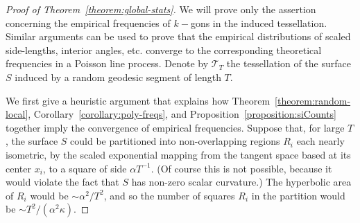 \documentclass[AHL, Unicode, longabstracts, published]{cedram}
\begin{document}
\begin{proof}
[Proof of Theorem~\ref{theorem:global-stats}] We will prove only the assertion concerning the empirical frequencies of $k-$gons in the induced tessellation. Similar arguments can be used to prove that the empirical distributions of scaled side-lengths, interior angles, etc. converge to the corresponding theoretical frequencies in a Poisson line process. Denote by $\mathcal{T}_{T}$ the tessellation of the surface $S$ induced by a random geodesic segment of length $T$.

We first give a heuristic argument that explains how Theorem~\ref{theorem:random-local}, Corollary~\ref{corollary:poly-freqs}, and Proposition~\ref{proposition:siCounts} together imply the convergence of empirical frequencies. Suppose that, for large $T$, the surface $S$ could be partitioned into non-overlapping regions $R_{i}$ each nearly isometric, by the scaled exponential mapping from the tangent space based at its center $x_{i}$, to a square of side $\alpha T^{-1}$. (Of course this is not possible, because it would violate the fact that $S$ has non-zero scalar curvature.) The hyperbolic area of $R_{i}$ would be $\sim \alpha^{2}/T^{2}$, and so the number of squares $R_{i}$ in the partition would be $\sim T^{2}/ (\alpha^{2}\kappa)$.


\end{proof}
\end{document}
